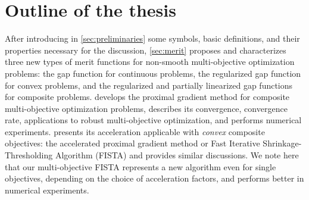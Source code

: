 \documentclass[../main]{subfiles}
\begin{document}
\section{Outline of the thesis}
After introducing in \cref{sec:preliminaries} some symbols, basic definitions, and their properties necessary for the discussion, \cref{sec:merit} proposes and characterizes three new types of merit functions for non-smooth multi-objective optimization problems: the gap function for continuous problems, the regularized gap function for convex problems, and the regularized and partially linearized gap functions for composite problems.
 develops the proximal gradient method for composite multi-objective optimization problems, describes its convergence, convergence rate, applications to robust multi-objective optimization, and performs numerical experiments.
 presents its acceleration applicable with \emph{convex} composite objectives: the accelerated proximal gradient method or Fast Iterative Shrinkage-Thresholding Algorithm (FISTA) and provides similar discussions.
We note here that our multi-objective FISTA represents a new algorithm even for single objectives, depending on the choice of acceleration factors, and performs better in numerical experiments.
\end{document}
